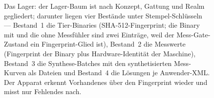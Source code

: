 \begin{nurlang}
\begin{figure}[htbp]
\caption{Das Lager: der Lager-Baum ist nach Konzept, Gattung und Realm gegliedert; darunter liegen vier Bestände unter Stempel-Schlüsseln --- Bestand~1 die Tier-Binaries (SHA-512-Fingerprint; die Binary mit und die ohne Messfühler sind zwei Einträge, weil der Mess-Gate-Zustand ein Fingerprint-Glied ist), Bestand~2 die Messwerte (Fingerprint der Binary plus Hardware-Identität der Maschine), Bestand~3 die Synthese-Batches mit den synthetisierten Mess-Kurven als Dateien und Bestand~4 die Lösungen je Anwender-XML\@. Der Apparat erkennt Vorhandenes über den Fingerprint wieder und misst nur Fehlendes nach.}\label{fig:lager-bestaende}
\end{figure}
\end{nurlang}
